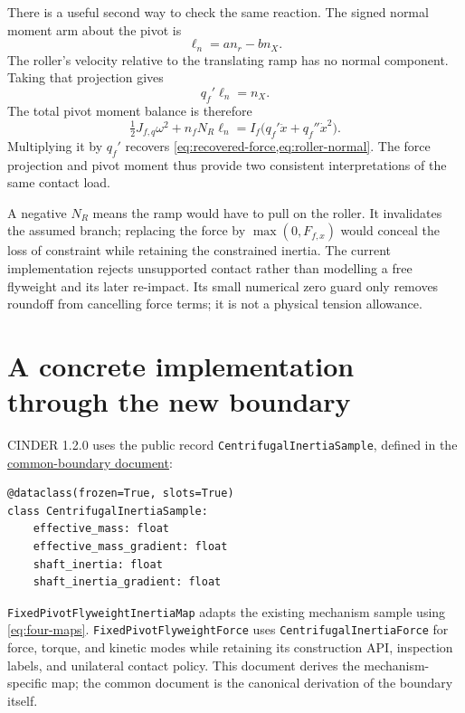 \documentclass[11pt,letterpaper]{article}
\numberwithin{equation}{section}
\newcommand{\half}{\tfrac12}
\begin{document}
There is a useful second way to check the same reaction. The signed normal moment arm about the pivot is
\begin{equation}
  \ell_n=a n_r-b n_X.
\end{equation}
The roller's velocity relative to the translating ramp has no normal component. Taking that projection gives
\begin{equation}
  q_f'\ell_n=n_X.
  \label{eq:normal-motion-ratio}
\end{equation}
The total pivot moment balance is therefore
\begin{equation}
  \half J_{f,q}\omega^2+n_fN_R\ell_n
       =I_f\bigl(q_f'\ddot x+q_f''\dot x^2\bigr).
  \label{eq:pivot-moment}
\end{equation}
Multiplying it by $q_f'$ recovers \cref{eq:recovered-force,eq:roller-normal}. The force projection and pivot moment thus provide two consistent interpretations of the same contact load.

A negative $N_R$ means the ramp would have to pull on the roller. It invalidates the assumed branch; replacing the force by $\max(0,F_{f,x})$ would conceal the loss of constraint while retaining the constrained inertia. The current implementation rejects unsupported contact rather than modelling a free flyweight and its later re-impact. Its small numerical zero guard only removes roundoff from cancelling force terms; it is not a physical tension allowance.

\section{A concrete implementation through the new boundary}
\label{sec:implementation}

CINDER 1.2.0 uses the public record
\texttt{CentrifugalInertiaSample}, defined in the
\href{../common_boundary/formulation.pdf}{common-boundary document}:
\begin{lstlisting}
@dataclass(frozen=True, slots=True)
class CentrifugalInertiaSample:
    effective_mass: float
    effective_mass_gradient: float
    shaft_inertia: float
    shaft_inertia_gradient: float
\end{lstlisting}
\texttt{FixedPivotFlyweightInertiaMap} adapts the existing mechanism sample
using \cref{eq:four-maps}. \texttt{FixedPivotFlyweightForce} uses
\texttt{CentrifugalInertiaForce} for force, torque, and kinetic modes while
retaining its construction API, inspection labels, and unilateral contact
policy. This document derives the mechanism-specific map; the common document
is the canonical derivation of the boundary itself.
\end{document}
